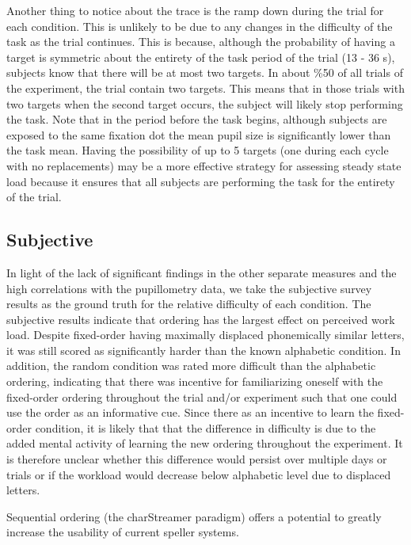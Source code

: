 \documentclass[10pt]{article}
\begin{document}
Another thing to notice about the trace is the ramp down during the
trial for each condition.  This is unlikely to be due to any changes in
the difficulty of the task as the trial continues. This is because, although
the probability of having a target is symmetric about the entirety of
the task period of the trial (13 - 36 s), subjects know that there will be at
most two targets.  In about \%50 of all trials of
the experiment, the trial contain two targets. This means that 
in those trials with two targets when the second target occurs, the subject will likely stop
performing the task.  Note that in the period before the task
begins, although subjects are exposed to the same fixation dot the
mean pupil size is significantly lower than the task mean.  
Having the possibility of up to 5 targets (one during each
cycle with no replacements) may be a more effective strategy
for assessing steady state load because it ensures that all
subjects are performing the task for the entirety of the trial.

\subsection{Subjective}
In light of the lack of significant findings in the other separate
measures and the high correlations with the pupillometry data, we take the subjective survey results as the ground
truth for the relative
difficulty of each condition.  The subjective results indicate that
ordering has the largest effect on perceived work load. Despite
fixed-order having maximally displaced phonemically similar letters,
it was still scored as significantly harder than the known
alphabetic condition.  In addition, the random condition was rated
more difficult than the alphabetic ordering, indicating that there
was incentive for familiarizing oneself with the fixed-order
ordering throughout the trial and/or experiment such that one could
use the order as an informative cue.  Since there as an incentive to
learn the fixed-order condition, it is likely that that the
difference in difficulty is due to the added mental activity of
learning the new ordering throughout the experiment. It is therefore
unclear whether this difference would persist over multiple days or
trials or if the workload would decrease below alphabetic level due
to displaced letters.

Sequential ordering (the charStreamer paradigm) offers a potential to
greatly increase the usability of current speller systems.
\end{document}
